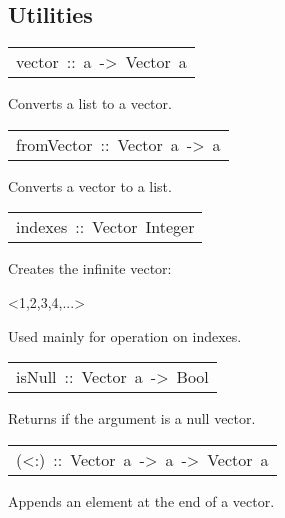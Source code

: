 \subsection{Utilities}
\begin{haddockdesc}
\item[\begin{tabular}{@{}l}
vector\ ::\ {\char 91}a{\char 93}\ ->\ Vector\ a
\end{tabular}]\haddockbegindoc
Converts a list to a vector.\par


\item[\begin{tabular}{@{}l}
fromVector\ ::\ Vector\ a\ ->\ {\char 91}a{\char 93}
\end{tabular}]\haddockbegindoc
Converts a vector to a list.\par


\item[\begin{tabular}{@{}l}
indexes\ ::\ Vector\ Integer
\end{tabular}]\haddockbegindoc
Creates the infinite vector:\par
\begin{interactive}
<1,2,3,4,...>\end{interactive}
Used mainly for operation on indexes.\par


\item[\begin{tabular}{@{}l}
isNull\ ::\ Vector\ a\ ->\ Bool
\end{tabular}]\haddockbegindoc
Returns  if the argument is a null vector.\par


\item[\begin{tabular}{@{}l}
(<:)\ ::\ Vector\ a\ ->\ a\ ->\ Vector\ a
\end{tabular}]\haddockbegindoc
Appends an element at the end of a vector.\par

\end{haddockdesc}
